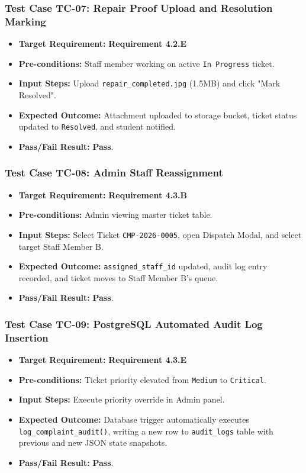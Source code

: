 \documentclass[12pt, a4paper]{article}
\begin{document}
\subsubsection{Test Case TC-07: Repair Proof Upload and Resolution Marking}
\begin{itemize}[leftmargin=*]
    \item \textbf{Target Requirement:} \textbf{Requirement 4.2.E}
    \item \textbf{Pre-conditions:} Staff member working on active \texttt{In Progress} ticket.
    \item \textbf{Input Steps:} Upload \texttt{repair\_completed.jpg} (1.5MB) and click "Mark Resolved".
    \item \textbf{Expected Outcome:} Attachment uploaded to storage bucket, ticket status updated to \texttt{Resolved}, and student notified.
    \item \textbf{Pass/Fail Result:} \textbf{Pass}.
\end{itemize}

\subsubsection{Test Case TC-08: Admin Staff Reassignment}
\begin{itemize}[leftmargin=*]
    \item \textbf{Target Requirement:} \textbf{Requirement 4.3.B}
    \item \textbf{Pre-conditions:} Admin viewing master ticket table.
    \item \textbf{Input Steps:} Select Ticket \texttt{CMP-2026-0005}, open Dispatch Modal, and select target Staff Member B.
    \item \textbf{Expected Outcome:} \texttt{assigned\_staff\_id} updated, audit log entry recorded, and ticket moves to Staff Member B's queue.
    \item \textbf{Pass/Fail Result:} \textbf{Pass}.
\end{itemize}

\subsubsection{Test Case TC-09: PostgreSQL Automated Audit Log Insertion}
\begin{itemize}[leftmargin=*]
    \item \textbf{Target Requirement:} \textbf{Requirement 4.3.E}
    \item \textbf{Pre-conditions:} Ticket priority elevated from \texttt{Medium} to \texttt{Critical}.
    \item \textbf{Input Steps:} Execute priority override in Admin panel.
    \item \textbf{Expected Outcome:} Database trigger automatically executes \texttt{log\_complaint\_audit()}, writing a new row to \texttt{audit\_logs} table with previous and new JSON state snapshots.
    \item \textbf{Pass/Fail Result:} \textbf{Pass}.
\end{itemize}
\end{document}
